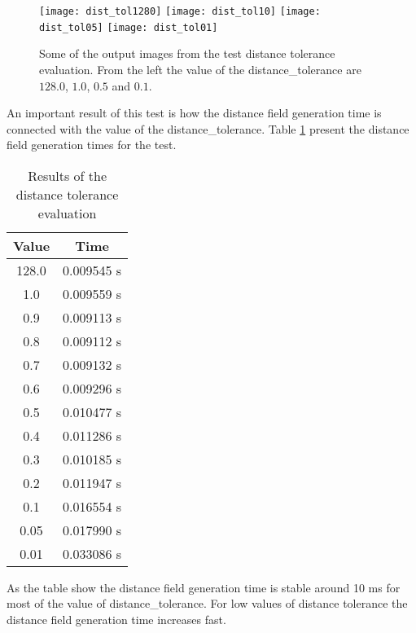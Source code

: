 \begin{figure}[H]
  \texttt{[image: dist\_tol1280]}
\endminipage\hfill
{}
  \texttt{[image: dist\_tol10]}
\endminipage\hfill
{}
  \texttt{[image: dist\_tol05]}
\endminipage\hfill
{}
  \texttt{[image: dist\_tol01]}
\endminipage\hfill
\caption{Some of the output images from the test distance tolerance evaluation. From the left the value of the distance\_tolerance are $128.0$, $1.0$, $0.5$ and $0.1$.}\label{fig:disttolout}
\end{figure} 

An important result of this test is how the distance field generation time is connected with the value of the distance\_tolerance. Table \ref{table:dist_tol} present the distance field generation times for the test.

\begin{table}[H]
\caption{Results of the distance tolerance evaluation}
\centering
\begin{tabular}{c c}
\hline
\hline %
Value & Time\\ [0.5ex] %
\hline
128.0 	&	0.009545 s  \\
1.0 	&	0.009559 s  \\
0.9 	&	0.009113 s  \\
0.8 	&	0.009112 s  \\
0.7 	&	0.009132 s  \\
0.6 	&	0.009296 s  \\
0.5 	&	0.010477 s  \\
0.4 	&	0.011286 s  \\
0.3 	&	0.010185 s  \\
0.2 	&	0.011947 s  \\
0.1 	&	0.016554 s  \\
0.05 	&	0.017990 s  \\
0.01 	&	0.033086 s  \\ [1ex]
\hline
\end{tabular}
\label{table:dist_tol}
\end{table}

As the table show the distance field generation time is stable around 10 ms for most of the value of distance\_tolerance. For low values of distance tolerance the distance field generation time increases fast.
